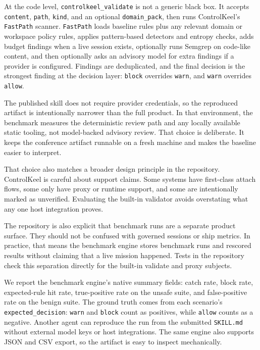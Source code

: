 \documentclass[10pt]{article}
\begin{document}
At the code level, \texttt{controlkeel\_validate} is not a generic black box. It accepts \texttt{content}, \texttt{path}, \texttt{kind}, and an optional \texttt{domain\_pack}, then runs ControlKeel's \texttt{FastPath} scanner. \texttt{FastPath} loads baseline rules plus any relevant domain or workspace policy rules, applies pattern-based detectors and entropy checks, adds budget findings when a live session exists, optionally runs Semgrep on code-like content, and then optionally asks an advisory model for extra findings if a provider is configured. Findings are deduplicated, and the final decision is the strongest finding at the decision layer: \texttt{block} overrides \texttt{warn}, and \texttt{warn} overrides \texttt{allow}.

The published skill does not require provider credentials, so the reproduced artifact is intentionally narrower than the full product. In that environment, the benchmark measures the deterministic review path and any locally available static tooling, not model-backed advisory review. That choice is deliberate. It keeps the conference artifact runnable on a fresh machine and makes the baseline easier to interpret.

That choice also matches a broader design principle in the repository. ControlKeel is careful about support claims. Some systems have first-class attach flows, some only have proxy or runtime support, and some are intentionally marked as unverified. Evaluating the built-in validator avoids overstating what any one host integration proves.

The repository is also explicit that benchmark runs are a separate product surface. They should not be confused with governed sessions or ship metrics. In practice, that means the benchmark engine stores benchmark runs and rescored results without claiming that a live mission happened. Tests in the repository check this separation directly for the built-in validate and proxy subjects.

We report the benchmark engine's native summary fields: catch rate, block rate, expected-rule hit rate, true-positive rate on the unsafe suite, and false-positive rate on the benign suite. The ground truth comes from each scenario's \texttt{expected\_decision}: \texttt{warn} and \texttt{block} count as positives, while \texttt{allow} counts as a negative. Another agent can reproduce the run from the submitted \texttt{SKILL.md} without external model keys or host integrations. The same engine also supports JSON and CSV export, so the artifact is easy to inspect mechanically.
\end{document}
